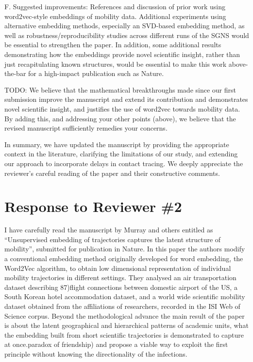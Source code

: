 \documentclass[12pt,a4paper]{article}
\newcommand{\response}[1]{{\leavevmode\noindent #1}}
\newcommand{\rcomment}[1]{%
\vspace{10pt}
\begin{tcolorbox}[colback=black!3,colframe=white!45!black]
#1
\end{tcolorbox}
}
\begin{document}
\rcomment{%
F. Suggested improvements:
References and discussion of prior work using word2vec-style embeddings of mobility data.
Additional experiments using alternative embedding methods, especially an SVD-based embedding method, as well as robustness/reproducibility studies across different runs of the SGNS would be essential to strengthen the paper.
In addition, some additional results demonstrating how the embeddings provide novel scientific insight, rather than just recapitulating known structures, would be essential to make this work above-the-bar for a high-impact publication such as Nature.

}


\response{
TODO: We believe that the mathematical breakthroughs made since our first submission improve the manuscript and extend its contribution and demonstrates novel scientific insight, and justifies the use of word2vec towards mobility data. By adding this, and addressing your other points (above), we believe that the revised manuscript sufficiently remedies your concerns. 

}

\bigskip
\response{%
In summary, we have updated the manuscript by providing the appropriate context in the literature, clarifying the limitations of our study, and extending our approach to incorporate delays in contact tracing. We deeply appreciate the reviewer's careful reading of the paper and their constructive comments. 
}


\newpage

\bigskip
\section*{\bf Response to Reviewer \#2}

\rcomment{%
I have carefully read the manuscript by Murray and others entitled as “Unsupervised embedding of trajectories captures the latent structure of mobility”, submitted for publication in Nature. In this paper the authors modify a conventional embedding method originally developed for word embedding, the Word2Vec algorithm, to obtain low dimensional representation of individual mobility trajectories in different settings. They analysed an air transportation dataset describing 87)flight connections between domestic airport of the US, a South Korean hotel accommodation dataset, and a world wide scientific mobility dataset obtained from the affiliations of researchers, recorded in the ISI Web of Science corpus. Beyond the methodological advance the main result of the paper is about the latent geographical and hierarchical patterns of academic units, what the embedding built from short scientific trajectories is demonstrated to capture at once.paradox of friendship) and propose a viable way to exploit the first principle without knowing the directionality of the infections.
}
\end{document}
